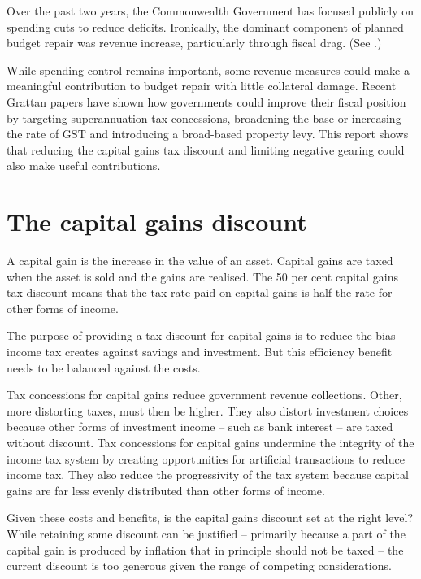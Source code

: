 Over the past two years, the Commonwealth Government has focused publicly on spending cuts to reduce deficits. Ironically, the dominant component of planned budget repair was revenue increase, particularly through fiscal drag. (See .) %
 
While spending control remains important, some revenue measures could make a meaningful contribution to budget repair with little collateral damage. Recent Grattan papers have shown how governments could improve their fiscal position by targeting superannuation tax concessions, broadening the base or increasing the rate of GST and introducing a broad-based property levy. This report shows that reducing the capital gains tax discount and limiting negative gearing could also make useful contributions.


\chapter{The capital gains discount}\label{chapter:The-capital-gains-discount}
A capital gain is the increase in the value of an asset. Capital gains are taxed when the asset is sold and the gains are realised. The 50 per cent capital gains tax discount means that the tax rate paid on capital gains is half the rate for other forms of income. 

The purpose of providing a tax discount for capital gains is to reduce the bias income tax creates against savings and investment. But this efficiency benefit needs to be balanced against the costs. 

Tax concessions for capital gains reduce government revenue collections. Other, more distorting taxes, must then be higher. They also distort investment choices because other forms of investment income – such as bank interest – are taxed without discount. Tax concessions for capital gains undermine the integrity of the income tax system by creating opportunities for artificial transactions to reduce income tax. They also reduce the progressivity of the tax system because capital gains are far less evenly distributed than other forms of income. 

Given these costs and benefits, is the capital gains discount set at the right level? While retaining some discount can be justified – primarily because a part of the capital gain is produced by inflation that in principle should not be taxed – the current discount is too generous given the range of competing considerations.


